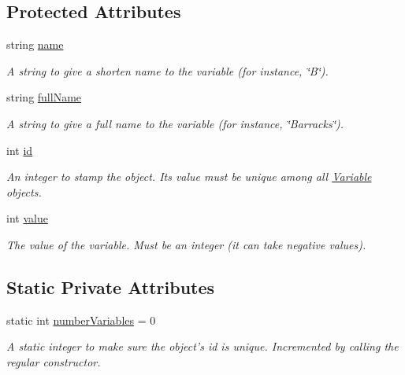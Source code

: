 \subsection*{Protected Attributes}
\begin{DoxyCompactItemize}
\item 
string \hyperlink{classghost_1_1Variable_a05cf4a4cd3a5c033028e0b0f11d1dafd}{name}
\begin{DoxyCompactList}\small\item\em A string to give a shorten name to the variable (for instance, \char`\"{}\-B\char`\"{}). \end{DoxyCompactList}\item 
string \hyperlink{classghost_1_1Variable_a87dc1fa73726f887a7ecbd5b9bfa7cab}{full\-Name}
\begin{DoxyCompactList}\small\item\em A string to give a full name to the variable (for instance, \char`\"{}\-Barracks\char`\"{}). \end{DoxyCompactList}\item 
int \hyperlink{classghost_1_1Variable_a3b1cd0e87cecbb58e115a9000be26f28}{id}
\begin{DoxyCompactList}\small\item\em An integer to stamp the object. Its value must be unique among all \hyperlink{classghost_1_1Variable}{Variable} objects. \end{DoxyCompactList}\item 
int \hyperlink{classghost_1_1Variable_a4623be8dd7ed2a0cb7033aec42033cb7}{value}
\begin{DoxyCompactList}\small\item\em The value of the variable. Must be an integer (it can take negative values). \end{DoxyCompactList}\end{DoxyCompactItemize}
\subsection*{Static Private Attributes}
\begin{DoxyCompactItemize}
\item 
static int \hyperlink{classghost_1_1Variable_a6c9862568c3f951afc4ef8dc75b874cf}{number\-Variables} = 0
\begin{DoxyCompactList}\small\item\em A static integer to make sure the object's id is unique. Incremented by calling the regular constructor. \end{DoxyCompactList}\end{DoxyCompactItemize}
